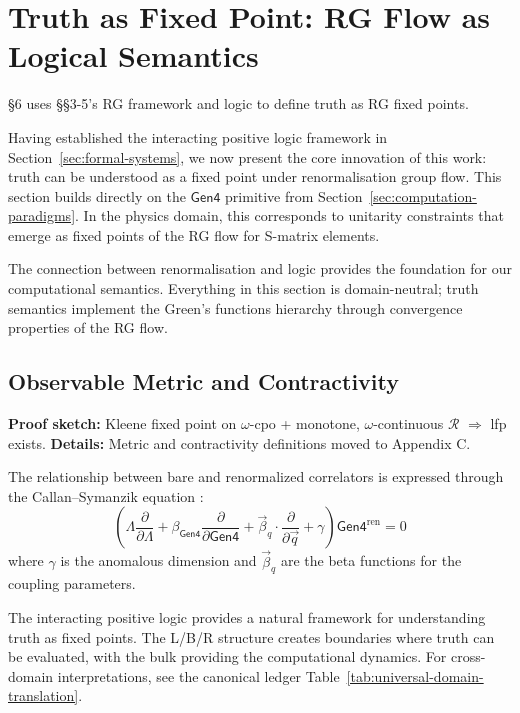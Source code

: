 \section{Truth as Fixed Point: RG Flow as Logical Semantics}
\label{sec:truth-fixed-point}

§6 uses §§3-5's RG framework and logic to define truth as RG fixed points.

Having established the interacting positive logic framework in Section~\ref{sec:formal-systems}, we now present the core innovation of this work: truth can be understood as a fixed point under renormalisation group flow. This section builds directly on the $\mathsf{Gen4}$ primitive from Section~\ref{sec:computation-paradigms}. In the physics domain, this corresponds to unitarity constraints that emerge as fixed points of the RG flow for S-matrix elements.

The connection between renormalisation and logic provides the foundation for our computational semantics. Everything in this section is domain-neutral; truth semantics implement the Green's functions hierarchy through convergence properties of the RG flow.

\subsection{Observable Metric and Contractivity}

\textbf{Proof sketch:} Kleene fixed point on $\omega$-cpo + monotone, $\omega$-continuous $\mathcal{R}$ $\Rightarrow$ lfp exists. \textbf{Details:} Metric and contractivity definitions moved to Appendix C.

\begin{definition}
\label{def:callan-symanzik}
The relationship between bare and renormalized correlators is expressed through the Callan–Symanzik equation \cite{callan1970,symanzik1970}:
\[
\left(\Lambda \frac{\partial}{\partial \Lambda} + \beta_{\mathsf{Gen4}} \frac{\partial}{\partial \mathsf{Gen4}} + \vec{\beta}_q \cdot \frac{\partial}{\partial \vec{q}} + \gamma\right) \mathsf{Gen4}^{\text{ren}} = 0
\]
where $\gamma$ is the anomalous dimension and $\vec{\beta}_q$ are the beta functions for the coupling parameters.
\end{definition}

The interacting positive logic provides a natural framework for understanding truth as fixed points. The L/B/R structure creates boundaries where truth can be evaluated, with the bulk providing the computational dynamics. For cross-domain interpretations, see the canonical ledger Table~\ref{tab:universal-domain-translation}.

